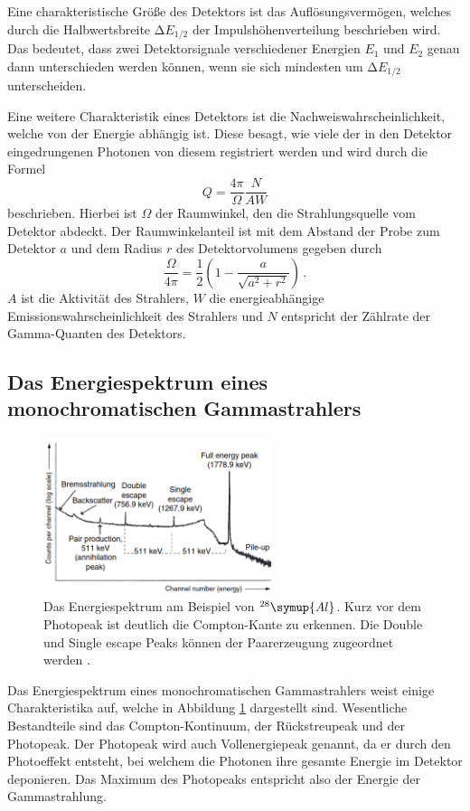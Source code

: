 Eine charakteristische Größe des Detektors ist das Auflösungsvermögen, welches durch die Halbwertsbreite $\increment E_{1/2}$ der Impulshöhenverteilung beschrieben wird.
Das bedeutet, dass zwei Detektorsignale verschiedener Energien $E_1$ und $E_2$ genau dann unterschieden werden können, wenn sie sich mindesten um $\increment E_{1/2}$ unterscheiden.

Eine weitere Charakteristik eines Detektors ist die Nachweiswahrscheinlichkeit, welche von der Energie abhängig ist.
Diese besagt, wie viele der in den Detektor eingedrungenen Photonen von diesem registriert werden und wird durch die Formel
\begin{equation}
Q=\frac{4\pi}{\Omega}\frac{N}{AW}
\end{equation}
beschrieben.
Hierbei ist $\Omega$ der Raumwinkel, den die Strahlungsquelle vom Detektor abdeckt.
Der Raumwinkelanteil ist mit dem Abstand der Probe zum Detektor $a$ und dem Radius $r$ des Detektorvolumens gegeben durch
\begin{equation}
    \label{eq:raumwinkel}
    \frac{\Omega}{4 \pi} = \frac{1}{2} \left(1 - \frac{a}{\sqrt{a^2 + r^2}}\right) \, .
\end{equation}
$A$ ist die Aktivität des Strahlers, $W$ die energieabhängige Emissionswahrscheinlichkeit des Strahlers und $N$ entspricht der Zählrate der Gamma-Quanten des Detektors.

\subsection{Das Energiespektrum eines monochromatischen Gammastrahlers}
\FloatBarrier
\begin{figure}
\centering
\includegraphics[width = 0.6\textwidth]{Spektrum.png}
\caption{Das Energiespektrum am Beispiel von $^{28}\symup{Al}$. Kurz vor dem Photopeak ist deutlich die Compton-Kante zu erkennen. Die Double und Single escape Peaks können der Paarerzeugung zugeordnet werden \cite{quelle02}.}
\label{fig:tfig8}
\end{figure}
\FloatBarrier
Das Energiespektrum eines monochromatischen Gammastrahlers weist einige Charakteristika auf, welche in Abbildung \ref{fig:tfig8} dargestellt sind.
Wesentliche Bestandteile sind das Compton-Kontinuum, der Rückstreupeak und der Photopeak.
Der Photopeak wird auch Vollenergiepeak genannt, da er durch den Photoeffekt entsteht, bei welchem die Photonen ihre gesamte Energie im Detektor deponieren.
Das Maximum des Photopeaks entspricht also der Energie der Gammastrahlung.

